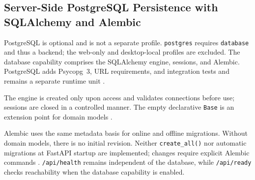 \subsection{Server-Side PostgreSQL Persistence with SQLAlchemy and Alembic}
\label{subsec:persistenz-postgresql}

PostgreSQL is optional and is not a separate profile. \texttt{postgres} requires
\texttt{database} and thus a backend; the web-only and desktop-local profiles are
excluded.
The database capability comprises the SQLAlchemy engine, sessions, and Alembic.
PostgreSQL adds Psycopg~3, URL requirements, and integration tests and remains a
separate runtime unit
\parencite{postgresql2026docs,kleiveist2026database}.

The engine is created only upon access and validates connections before use;
sessions are closed in a controlled manner. The empty declarative
\texttt{Base} is an extension point for domain models
\parencite{sqlalchemy2026engines}.

Alembic uses the same metadata basis for online and offline migrations. Without
domain models, there is no initial revision. Neither \texttt{create\_all()} nor
automatic migrations at FastAPI startup are implemented; changes require
explicit Alembic commands
\parencite{alembic2026tutorial,kleiveist2026database}. \texttt{/api/health}
remains independent of the database, while \texttt{/api/ready} checks
reachability when the database capability is enabled.
